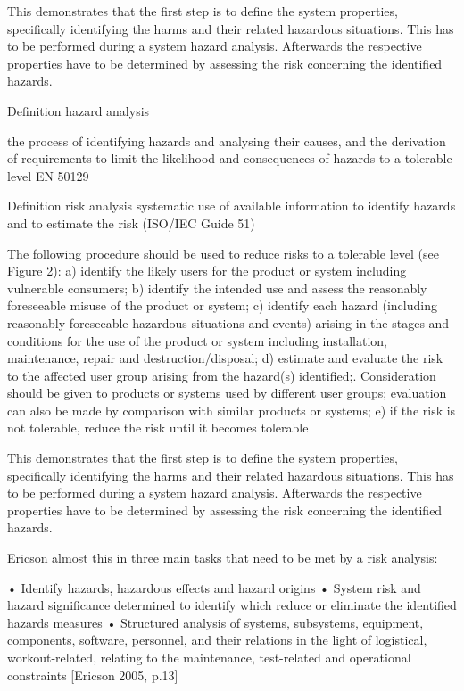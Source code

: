\documentclass{template/openetcs_report}
\begin{document}
This demonstrates that the first step is to define the system properties, specifically identifying the harms and their related hazardous situations. This has to be performed during a system hazard analysis. Afterwards the respective properties have to be determined by assessing the risk concerning the identified hazards.


Definition hazard analysis 

    the process of identifying hazards and analysing their causes, and the derivation of requirements to limit the likelihood and consequences of hazards to a tolerable level
EN 50129

Definition risk analysis 
systematic use of available information to identify hazards and to estimate the risk (ISO/IEC Guide 51)

The following procedure should be used to reduce risks to a tolerable level (see Figure 2): 
a)  identify the likely users for the product or system including vulnerable consumers; 
b)  identify the intended use and assess the reasonably foreseeable misuse of the product or system; 
c)  identify each hazard (including reasonably foreseeable hazardous situations and events) arising in the 
stages and conditions for the use of the product or system including installation, maintenance, repair and 
destruction/disposal; 
d) estimate and evaluate the risk to the affected user group arising from the hazard(s)  identified;. 
Consideration should be given to products or systems used by different user groups; evaluation can also 
be made by comparison with similar products or systems; 
e)  if the risk is not tolerable, reduce the risk until it becomes tolerable


This demonstrates that the first step is to define the system properties, specifically identifying the harms and their related hazardous situations. This has to be performed during a system hazard analysis. Afterwards the respective properties have to be determined by assessing the risk concerning the identified hazards. 

Ericson almost this in three main tasks that need to be met by a risk analysis:

• Identify hazards, hazardous effects and hazard origins
• System risk and hazard significance determined to identify which reduce or eliminate the identified hazards measures
• Structured analysis of systems, subsystems, equipment, components, software, personnel, and their relations in the light of logistical, workout-related, relating to the maintenance, test-related and operational constraints [Ericson 2005, p.13]
\end{document}
